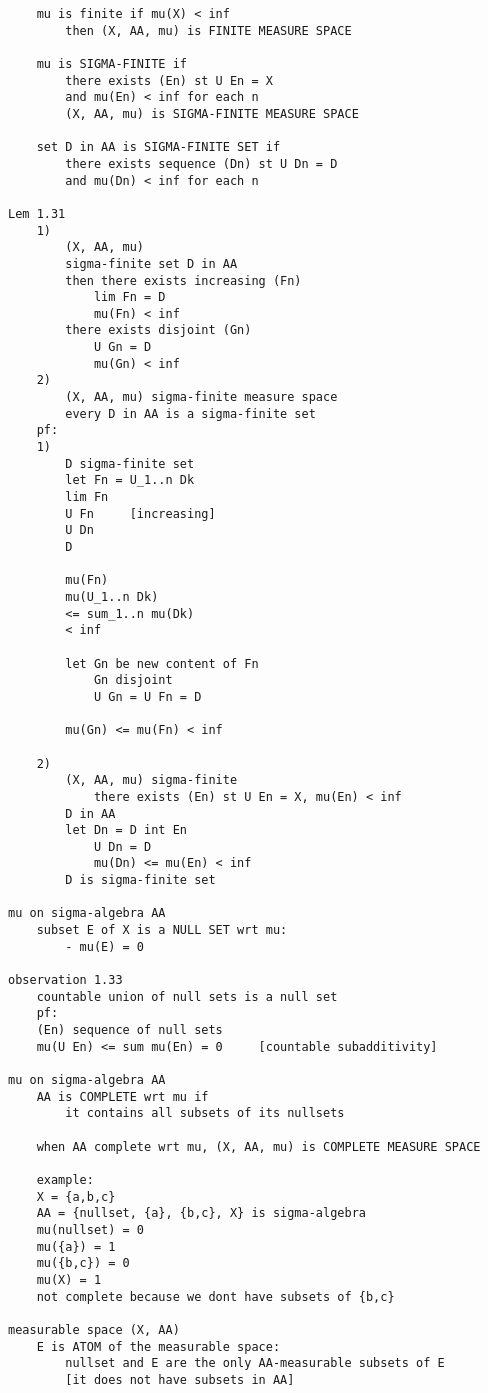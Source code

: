 \documentclass{article}
\begin{document}
\begin{flushleft}
\begin{verbatim}
    mu is finite if mu(X) < inf 
        then (X, AA, mu) is FINITE MEASURE SPACE 

    mu is SIGMA-FINITE if 
        there exists (En) st U En = X 
        and mu(En) < inf for each n 
        (X, AA, mu) is SIGMA-FINITE MEASURE SPACE 

    set D in AA is SIGMA-FINITE SET if 
        there exists sequence (Dn) st U Dn = D 
        and mu(Dn) < inf for each n 

Lem 1.31 
    1)
        (X, AA, mu) 
        sigma-finite set D in AA 
        then there exists increasing (Fn) 
            lim Fn = D
            mu(Fn) < inf 
        there exists disjoint (Gn)
            U Gn = D 
            mu(Gn) < inf 
    2)
        (X, AA, mu) sigma-finite measure space 
        every D in AA is a sigma-finite set 
    pf: 
    1)
        D sigma-finite set 
        let Fn = U_1..n Dk
        lim Fn
        U Fn     [increasing]
        U Dn 
        D 
        
        mu(Fn)
        mu(U_1..n Dk)
        <= sum_1..n mu(Dk)
        < inf

        let Gn be new content of Fn
            Gn disjoint 
            U Gn = U Fn = D 
        
        mu(Gn) <= mu(Fn) < inf 
    
    2)
        (X, AA, mu) sigma-finite 
            there exists (En) st U En = X, mu(En) < inf 
        D in AA 
        let Dn = D int En 
            U Dn = D 
            mu(Dn) <= mu(En) < inf 
        D is sigma-finite set 

mu on sigma-algebra AA 
    subset E of X is a NULL SET wrt mu:
        - mu(E) = 0

observation 1.33
    countable union of null sets is a null set 
    pf:
    (En) sequence of null sets 
    mu(U En) <= sum mu(En) = 0     [countable subadditivity]

mu on sigma-algebra AA 
    AA is COMPLETE wrt mu if
        it contains all subsets of its nullsets 

    when AA complete wrt mu, (X, AA, mu) is COMPLETE MEASURE SPACE 

    example:
    X = {a,b,c}
    AA = {nullset, {a}, {b,c}, X} is sigma-algebra 
    mu(nullset) = 0 
    mu({a}) = 1
    mu({b,c}) = 0
    mu(X) = 1
    not complete because we dont have subsets of {b,c}

measurable space (X, AA)
    E is ATOM of the measurable space:
        nullset and E are the only AA-measurable subsets of E
        [it does not have subsets in AA]


\end{verbatim}
\end{flushleft}
\end{document}
